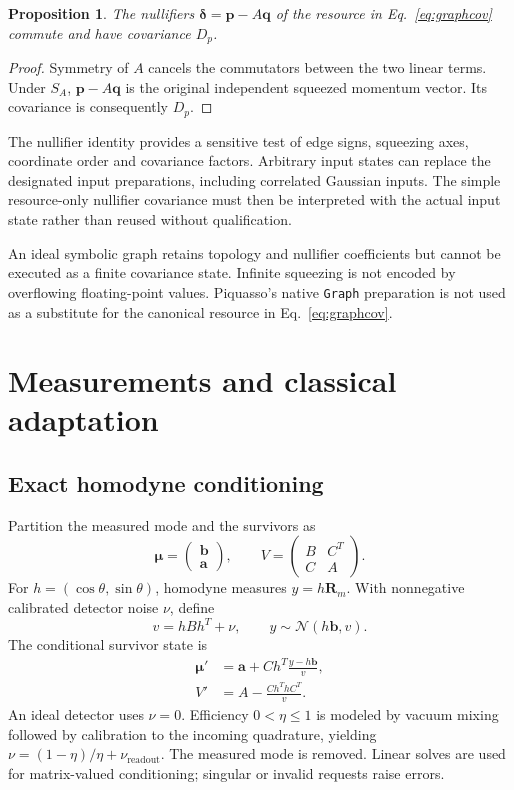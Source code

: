 \documentclass[a4paper,twocolumn,11pt,nopdfoutputerror]{quantumarticle}
\newtheorem{proposition}{Proposition}
\begin{document}
\begin{proposition}
The nullifiers $\bm\delta=\bm p-A\bm q$ of the resource in
Eq.~\eqref{eq:graphcov} commute and have covariance $D_p$.
\end{proposition}
\begin{proof}
Symmetry of $A$ cancels the commutators between the two linear terms. Under
$S_A$, $\bm p-A\bm q$ is the original independent squeezed momentum vector.
Its covariance is consequently $D_p$.
\end{proof}

The nullifier identity provides a sensitive test of edge signs, squeezing axes,
coordinate order and covariance factors. Arbitrary input states can replace the
designated input preparations, including correlated Gaussian inputs. The simple
resource-only nullifier covariance must then be interpreted with the actual
input state rather than reused without qualification.

An ideal symbolic graph retains topology and nullifier coefficients but cannot
be executed as a finite covariance state. Infinite squeezing is not encoded by
overflowing floating-point values. Piquasso's native \texttt{Graph} preparation
is not used as a substitute for the canonical resource in Eq.~\eqref{eq:graphcov}.

\section{Measurements and classical adaptation}

\subsection{Exact homodyne conditioning}

Partition the measured mode and the survivors as
\begin{equation}
 \bm\mu=\begin{pmatrix}\bm b\\\bm a\end{pmatrix},\qquad
 V=\begin{pmatrix}B&C^T\\C&A\end{pmatrix}.
\end{equation}
For $h=(\cos\theta,\sin\theta)$, homodyne measures $y=h\bm R_m$.
With nonnegative calibrated detector noise $\nu$, define
\begin{equation}
 v=hBh^T+\nu,\qquad y\sim\mathcal N(h\bm b,v).
\end{equation}
The conditional survivor state is
\begin{align}
 \bm\mu'&=\bm a+Ch^T\frac{y-h\bm b}{v},\label{eq:hommean}\\
 V'&=A-\frac{Ch^ThC^T}{v}.\label{eq:homcov}
\end{align}
An ideal detector uses $\nu=0$. Efficiency $0<\eta\leq1$ is modeled by vacuum
mixing followed by calibration to the incoming quadrature, yielding
$\nu=(1-\eta)/\eta+\nu_{\mathrm{readout}}$. The measured mode is removed.
Linear solves are used for matrix-valued conditioning; singular or invalid
requests raise errors.
\end{document}
